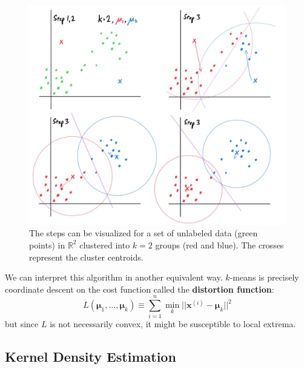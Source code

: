     \begin{figure}[H]
      \centering 
      \includegraphics[scale=0.25]{img/k_means_clustering.jpg}
      \caption{The steps can be visualized for a set of unlabeled data (green points) in $\mathbb{R}^2$ clustered into $k=2$ groups (red and blue). The crosses represent the cluster centroids.} 
      \label{fig:k_means_clustering}
    \end{figure}

    We can interpret this algorithm in another equivalent way. $k$-means is precisely coordinate descent on the cost function called the \textbf{distortion function}: 
    \begin{equation}
      L(\boldsymbol{\mu}_1, \ldots, \boldsymbol{\mu}_k) \equiv \sum_{i=1}^n \min_k ||\mathbf{x}^{(i)} - \boldsymbol{\mu}_k ||^2
    \end{equation}
    but since $L$ is not necessarily convex, it might be susceptible to local extrema.

  \subsection{Kernel Density Estimation}


